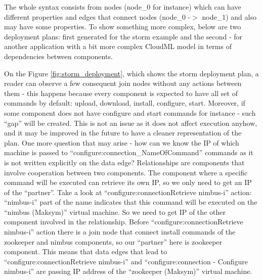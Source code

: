 \noindent 

\noindent The whole syntax consists from nodes (node\_0 for instance) which can have different properties and edges that connect nodes (node\_0 -$>$ node\_1) and also may have some properties. To show something more complex, below are two deployment plans: first generated for the storm example and the second - for another application with a bit more complex CloudML model in terms of dependencies between components.  

\noindent 

\noindent On the Figure \ref{fig:storm_deployment}, which shows the storm deployment plan, a reader can observe a few consequent join nodes without any actions between them - this happens because every component is expected to have all set of commands by default: upload, download, install, configure, start. Moreover, if some component does not have configure and start commands for instance - such ``gap'' will be created. This is not an issue as it does not affect execution anyhow, and it may be improved in the future to have a cleaner representation of the plan. One more question that may arise - how can we know the IP of which machine is passed to ``configure:connection\_NameOfCommand'' commands as it is not written explicitly on the data edge? Relationships are components that involve cooperation between two components. The component where a specific command will be executed can retrieve its own IP, so we only need to get an IP of the ``partner''. Take a look at ``configure:connectionRetrieve nimbus-i'' action: ``nimbus-i'' part of the name indicates that this command will be executed on the ``nimbus (Maksym)'' virtual machine. So we need to get IP of the other component involved in the relationship. Before ``configure:connectionRetrieve nimbus-i'' action there is a join node that connect install commands of the zookeeper and nimbus components, so our ``partner'' here is zookeeper component. This means that data edges that lead to ``configure:connectionRetrieve nimbus-i'' and ``configure:connection - Configure nimbus-i'' are passing IP address of the ``zookeeper (Maksym)'' virtual machine.

\noindent 

